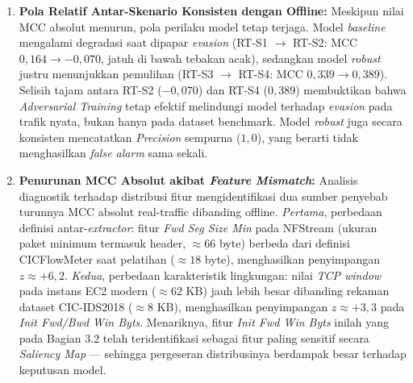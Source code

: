 \documentclass[11pt, a4paper]{article}
\begin{document}
\begin{enumerate}
    \item \textbf{Pola Relatif Antar-Skenario Konsisten dengan Offline:} Meskipun nilai MCC absolut menurun, pola perilaku model tetap terjaga. Model \textit{baseline} mengalami degradasi saat dipapar \textit{evasion} (RT-S1 $\rightarrow$ RT-S2: MCC $0{,}164 \rightarrow -0{,}070$, jatuh di bawah tebakan acak), sedangkan model \textit{robust} justru menunjukkan pemulihan (RT-S3 $\rightarrow$ RT-S4: MCC $0{,}339 \rightarrow 0{,}389$). Selisih tajam antara RT-S2 ($-0{,}070$) dan RT-S4 ($0{,}389$) membuktikan bahwa \textit{Adversarial Training} tetap efektif melindungi model terhadap \textit{evasion} pada trafik nyata, bukan hanya pada dataset benchmark. Model \textit{robust} juga secara konsisten mencatatkan \textit{Precision} sempurna ($1{,}0$), yang berarti tidak menghasilkan \textit{false alarm} sama sekali.

    \item \textbf{Penurunan MCC Absolut akibat \textit{Feature Mismatch}:} Analisis diagnostik terhadap distribusi fitur mengidentifikasi dua sumber penyebab turunnya MCC absolut real-traffic dibanding offline. \textit{Pertama}, perbedaan definisi antar-\textit{extractor}: fitur \textit{Fwd Seg Size Min} pada NFStream (ukuran paket minimum termasuk header, $\approx 66$ byte) berbeda dari definisi CICFlowMeter saat pelatihan ($\approx 18$ byte), menghasilkan penyimpangan $z \approx +6{,}2$. \textit{Kedua}, perbedaan karakteristik lingkungan: nilai \textit{TCP window} pada instans EC2 modern ($\approx 62$ KB) jauh lebih besar dibanding rekaman dataset CIC-IDS2018 ($\approx 8$ KB), menghasilkan penyimpangan $z \approx +3{,}3$ pada \textit{Init Fwd/Bwd Win Byts}. Menariknya, fitur \textit{Init Fwd Win Byts} inilah yang pada Bagian 3.2 telah teridentifikasi sebagai fitur paling sensitif secara \textit{Saliency Map} --- sehingga pergeseran distribusinya berdampak besar terhadap keputusan model.
\end{enumerate}
\end{document}
